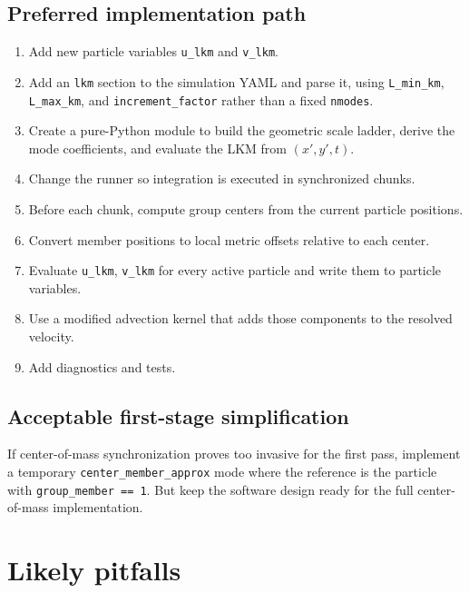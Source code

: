 \documentclass[11pt,a4paper]{article}
\begin{document}
	\subsection*{Preferred implementation path}
	
	\begin{enumerate}[label=\arabic*.]
		\item Add new particle variables \texttt{u\_lkm} and \texttt{v\_lkm}.
		\item Add an \texttt{lkm} section to the simulation YAML and parse it, using \texttt{L\_min\_km}, \texttt{L\_max\_km}, and \texttt{increment\_factor} rather than a fixed \texttt{nmodes}.
		\item Create a pure-Python module to build the geometric scale ladder, derive the mode coefficients, and evaluate the LKM from $(x',y',t)$.
		\item Change the runner so integration is executed in synchronized chunks.
		\item Before each chunk, compute group centers from the current particle positions.
		\item Convert member positions to local metric offsets relative to each center.
		\item Evaluate \texttt{u\_lkm}, \texttt{v\_lkm} for every active particle and write them to particle variables.
		\item Use a modified advection kernel that adds those components to the resolved velocity.
		\item Add diagnostics and tests.
	\end{enumerate}
	
	\subsection*{Acceptable first-stage simplification}
	
	If center-of-mass synchronization proves too invasive for the first pass, implement a temporary \texttt{center\_member\_approx} mode where the reference is the particle with \texttt{group\_member == 1}. But keep the software design ready for the full center-of-mass implementation.
	
	\section{Likely pitfalls}
	
\end{document}
